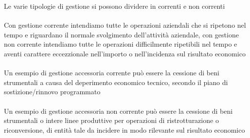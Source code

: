 \documentclass{report}
\begin{document}
Le varie tipologie di gestione si possono dividere in correnti e non correnti
\\
\\
Con gestione corrente intendiamo tutte le operazioni aziendali che si ripetono nel tempo e riguardano il normale svolgimento dell'attività aziendale, con gestione non corrente intendiamo tutte le operazioni difficilmente ripetibili nel tempo e aventi carattere eccezzionale nell'importo o nell'incidenza sul risultato economico
\\
\\
Un esempio di gestione accessoria corrente può essere la cessione di beni strumentali a causa del deperimento economico tecnico, secondo il piano di sostizione/rinnovo programmato
\\
\\
Un esempio di gestione accessoria non corrente può essere la cessione di beni strumentali o intere linee produttive per operazioni di ristrotturazione o riconversione, di entità tale da incidere in modo rilevante sul risultato economico
\end{document}
